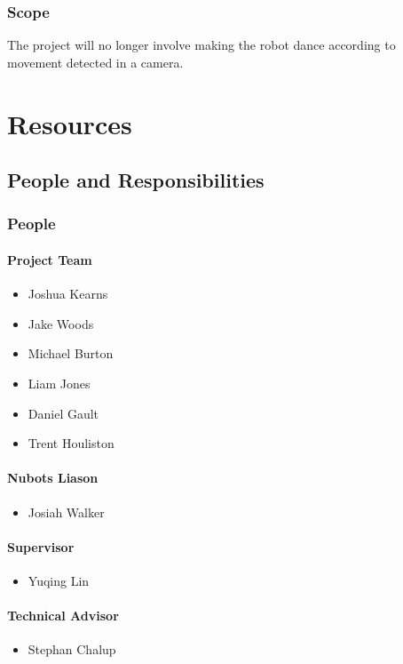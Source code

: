 \documentclass[english,12pt]{scrartcl}
\begin{document}
			\subsubsection{Scope}
	The project will no longer involve making the robot dance according to movement detected in a camera.

	\section{Resources}
		\subsection{People and Responsibilities}
			\subsubsection{People}
				\paragraph{Project Team}
					\begin{itemize}
						\item Joshua Kearns
						\item Jake Woods
						\item Michael Burton
						\item Liam Jones
						\item Daniel Gault
						\item Trent Houliston
					\end{itemize}
				\paragraph{Nubots Liason}
					\begin{itemize}
						\item Josiah Walker
					\end{itemize}
				\paragraph{Supervisor}
					\begin{itemize}
						\item Yuqing Lin
					\end{itemize}
				\paragraph{Technical Advisor}
					\begin{itemize}
						\item Stephan Chalup
					\end{itemize}
\end{document}
